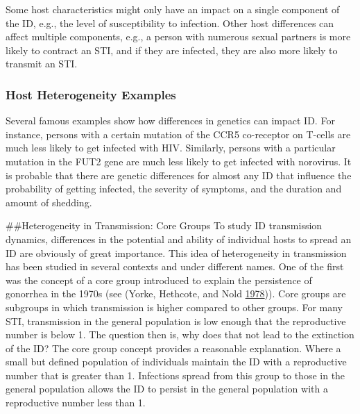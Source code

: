 \documentclass[]{book}
\theoremstyle{definition}
\theoremstyle{definition}
\theoremstyle{definition}
\theoremstyle{remark}
\begin{document}
Some host characteristics might only have an impact on a single
component of the ID, e.g., the level of susceptibility to infection.
Other host differences can affect multiple components, e.g., a person
with numerous sexual partners is more likely to contract an STI, and if
they are infected, they are also more likely to transmit an STI.

\hypertarget{myexamplebox}{%
\subsubsection{Host Heterogeneity Examples}\label{myexamplebox}}

Several famous examples show how differences in genetics can impact ID.
For instance, persons with a certain mutation of the CCR5 co-receptor on
T-cells are much less likely to get infected with HIV. Similarly,
persons with a particular mutation in the FUT2 gene are much less likely
to get infected with norovirus. It is probable that there are genetic
differences for almost any ID that influence the probability of getting
infected, the severity of symptoms, and the duration and amount of
shedding.

\#\#Heterogeneity in Transmission: Core Groups To study ID transmission
dynamics, differences in the potential and ability of individual hosts
to spread an ID are obviously of great importance. This idea of
heterogeneity in transmission has been studied in several contexts and
under different names. One of the first was the concept of a core group
introduced to explain the persistence of gonorrhea in the 1970s (see
(Yorke, Hethcote, and Nold \protect\hyperlink{ref-yorke78}{1978})). Core
groups are subgroups in which transmission is higher compared to other
groups. For many STI, transmission in the general population is low
enough that the reproductive number is below 1. The question then is,
why does that not lead to the extinction of the ID? The core group
concept provides a reasonable explanation. Where a small but defined
population of individuals maintain the ID with a reproductive number
that is greater than 1. Infections spread from this group to those in
the general population allows the ID to persist in the general
population with a reproductive number less than 1.
\end{document}
